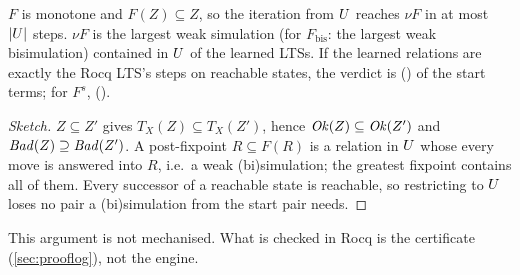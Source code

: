 \begin{proposition}
$F$ is monotone and $F(Z)\subseteq Z$, so the iteration from $U$
reaches $\nu F$ in at most $|U|$ steps. $\nu F$ is the largest weak
simulation (for $F_{\mathrm{bis}}$: the largest weak bisimulation)
contained in $U$ of the learned LTSs. If the learned relations are
exactly the Rocq LTS's steps on reachable states, the verdict is
 () of the start terms; for
$F^{s}$,  ().
\end{proposition}
\begin{proof}[Sketch]
$Z\subseteq Z'$ gives $T_X(Z)\subseteq T_X(Z')$, hence
$\mathit{Ok}(Z)\subseteq\mathit{Ok}(Z')$ and $\mathit{Bad}(Z)\supseteq\mathit{Bad}(Z')$. A post-fixpoint
$R\subseteq F(R)$ is a relation in $U$ whose every move is answered
into $R$, i.e.\ a weak (bi)simulation; the greatest fixpoint contains all
of them. Every successor of a reachable state is reachable, so
restricting to $U$ loses no pair a (bi)simulation from the start pair
needs.
\end{proof}
This argument is not mechanised. What is checked in Rocq is the
certificate (\cref{sec:prooflog}), not the engine.

